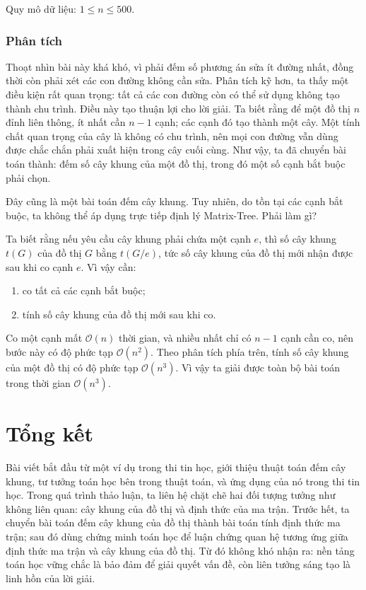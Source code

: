 \documentclass[11pt]{article}
\newcommand{\Oh}{\mathcal{O}}
\begin{document}
Quy mô dữ liệu: \(1\le n\le 500\).

\subsubsection*{Phân tích}

Thoạt nhìn bài này khá khó, vì phải đếm số phương án sửa ít đường nhất, đồng
thời còn phải xét các con đường không cần sửa. Phân tích kỹ hơn, ta thấy một
điều kiện rất quan trọng: tất cả các con đường còn có thể sử dụng không tạo
thành chu trình. Điều này tạo thuận lợi cho lời giải. Ta biết rằng để một đồ
thị \(n\) đỉnh liên thông, ít nhất cần \(n-1\) cạnh; các cạnh đó tạo thành một
cây. Một tính chất quan trọng của cây là không có chu trình, nên mọi con đường
vẫn dùng được chắc chắn phải xuất hiện trong cây cuối cùng. Như vậy, ta đã
chuyển bài toán thành: đếm số cây khung của một đồ thị, trong đó một số cạnh
bắt buộc phải chọn.

Đây cũng là một bài toán đếm cây khung. Tuy nhiên, do tồn tại các cạnh bắt
buộc, ta không thể áp dụng trực tiếp định lý Matrix-Tree. Phải làm gì?

Ta biết rằng nếu yêu cầu cây khung phải chứa một cạnh \(e\), thì số cây khung
\(t(G)\) của đồ thị \(G\) bằng \(t(G/e)\), tức số cây khung của đồ thị mới
nhận được sau khi co cạnh \(e\). Vì vậy cần:
\begin{enumerate}
  \item co tất cả các cạnh bắt buộc;
  \item tính số cây khung của đồ thị mới sau khi co.
\end{enumerate}

Co một cạnh mất \(\Oh(n)\) thời gian, và nhiều nhất chỉ có \(n-1\) cạnh cần
co, nên bước này có độ phức tạp \(\Oh(n^2)\). Theo phân tích phía trên, tính
số cây khung của một đồ thị có độ phức tạp \(\Oh(n^3)\). Vì vậy ta giải được
toàn bộ bài toán trong thời gian \(\Oh(n^3)\).

\section{Tổng kết}

Bài viết bắt đầu từ một ví dụ trong thi tin học, giới thiệu thuật toán đếm cây
khung, tư tưởng toán học bên trong thuật toán, và ứng dụng của nó trong thi
tin học. Trong quá trình thảo luận, ta liên hệ chặt chẽ hai đối tượng tưởng
như không liên quan: cây khung của đồ thị và định thức của ma trận. Trước hết,
ta chuyển bài toán đếm cây khung của đồ thị thành bài toán tính định thức ma
trận; sau đó dùng chứng minh toán học để luận chứng quan hệ tương ứng giữa
định thức ma trận và cây khung của đồ thị. Từ đó không khó nhận ra: nền tảng
toán học vững chắc là bảo đảm để giải quyết vấn đề, còn liên tưởng sáng tạo
là linh hồn của lời giải.
\end{document}
